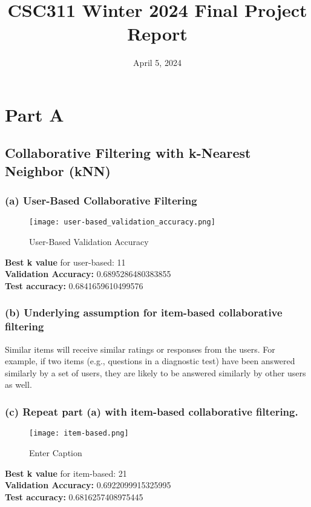 \documentclass{article}
\title{CSC311 Winter 2024 Final Project Report}
\date{April 5, 2024}
\begin{document}
\maketitle
\section*{Part A}

\subsection*{Collaborative Filtering with k-Nearest Neighbor (kNN)}

\subsubsection*{(a) User-Based Collaborative Filtering}


\begin{figure}[H]
    \centering
    \texttt{[image: user-based\_validation\_accuracy.png]}
    \caption{User-Based Validation Accuracy}
    \label{fig:enter-label}
\end{figure}
\textbf{Best k value} for user-based: 11\\
\textbf{Validation Accuracy:} 0.6895286480383855\\
\textbf{Test accuracy:} 0.6841659610499576



\subsubsection*{(b) Underlying assumption for item-based collaborative filtering}

Similar items will receive similar ratings or responses from the users.
For example, if two items (e.g., questions in a diagnostic test) have been answered similarly by a set of users, they are likely to be answered similarly by other users as well.

\subsubsection*{(c) Repeat part (a) with item-based collaborative filtering.}
\begin{figure}[H]
    \centering
    \texttt{[image: item-based.png]}
    \caption{Enter Caption}
    \label{fig:enter-label}
\end{figure}
\textbf{Best k value} for item-based: 21\\
\textbf{Validation Accuracy:} 0.6922099915325995\\
\textbf{Test accuracy:} 0.6816257408975445
\end{document}
